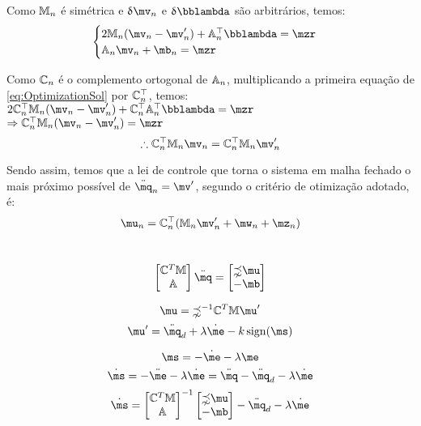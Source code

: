 Como $\mathbb{M}_n$ \'e sim\'etrica e $\dl \mv_n$ e $\dl \mlambda$ s\~ao arbitr\'arios, temos:
\begin{equation} \label{eq:OptimizationSol}
\begin{cases}
2 \mM_n (\mv_n - \mv'_n) + \mA_n^\top \mlambda = \mzr \\
\mA_n \mv_n + \mb_n = \mzr
\end{cases}
\end{equation}

Como $\mathbb{C}_n$ \'e o complemento ortogonal de $\mathbb{A}_n$, multiplicando a primeira equa\c{c}\~ao de \eqref{eq:OptimizationSol} por $\mathbb{C}_n^\top$, temos: \\

$ 2 \mC_n^\top \mM_n (\mv_n - \mv'_n) + \mC_n^\top \mA_n^\top \mlambda = \mzr $
$ \Rightarrow  \mC_n^\top \mM_n (\mv_n - \mv'_n)  = \mzr $
\begin{equation} \label{eq:OptimizationSol2}
\therefore \mC_n^\top \mM_n \mv_n  = \mC_n^\top \mM_n  \mv'_n
\end{equation}

Sendo assim, temos que a lei de controle que torna o sistema em malha fechado o mais pr\'oximo poss\'ivel de $\ddot{\mq}_n = \mv'$, segundo o crit\'erio de otimiza\c{c}\~ao adotado, \'e:
\begin{equation} \label{eq:ControlLawFinal}
\mu_n = \mC_n^\top ( \mM_n \mv'_n + \mw_n + \mz_n )
\end{equation}

\newpage

\\

$$
\begin{bmatrix}
\mC^T \mM \\
\mA
\end{bmatrix}
\ddot{\mq}
=
\begin{bmatrix}
\mathbb{\zeta} \mu \\
-\mb
\end{bmatrix}
$$



$$ \mu = \mathbb{\zeta}^{-1} \mC^T \mM \mu' $$
$$ \mu' = \ddot{\mq}_d + \lambda \dot{\me} - k  \sign (\ms) $$

$$ \ms = - \dot{\me} - \lambda \me $$
$$ \dot{\ms} = - \ddot{\me} - \lambda \dot{\me} = \ddot{\mq} - \ddot{\mq}_d  - \lambda \dot{\me} $$
$$ \dot{\ms} =  \begin{bmatrix}
\mC^T \mM \\
\mA
\end{bmatrix}^{-1}
\begin{bmatrix}
\mathbb{\zeta} \mu \\
-\mb
\end{bmatrix}
 - \ddot{\mq}_d  - \lambda \dot{\me} $$
 
